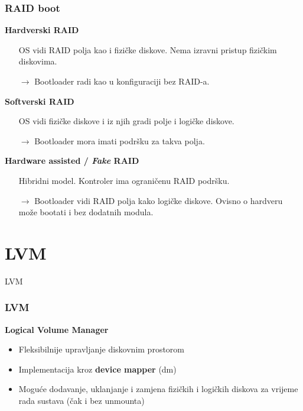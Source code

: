\documentclass[t]{beamer}
\begin{document}
\begin{frame}
	\frametitle{RAID boot}
	\textbf{Hardverski RAID}
	\begin{itemize}
		\item[] OS vidi RAID polja kao i fizičke diskove. Nema izravni pristup fizičkim diskovima.
		\item[$\rightarrow$] Bootloader radi kao u konfiguraciji bez RAID-a.
	\end{itemize}
	\vfill
	\textbf{Softverski RAID}
	\begin{itemize}
		\item[] OS vidi fizičke diskove i iz njih gradi polje i logičke diskove.
		\item[$\rightarrow$] Bootloader mora imati podršku za takva polja.
	\end{itemize}
	\vfill
	\textbf{Hardware assisted / \textit{Fake} RAID}
	\begin{itemize}
		\item[] Hibridni model. Kontroler ima ograničenu RAID podršku.
		\item[$\rightarrow$] Bootloader vidi RAID polja kako logičke diskove. Ovisno o hardveru može bootati i bez dodatnih modula.
	\end{itemize}
\end{frame}

\section{LVM}

\begin{frame}
	\vspace*{\fill}
		\begin{center}
			\Huge{LVM}
		\end{center}
	\vspace*{\fill}
\end{frame}

\begin{frame}
	\frametitle{LVM}
	\textbf{Logical Volume Manager}
	\begin{itemize}
		\item Fleksibilnije upravljanje diskovnim prostorom
		\item Implementacija kroz \textbf{device mapper} (dm)
	\end{itemize}
	\begin{itemize}
		\item Moguće dodavanje, uklanjanje i zamjena fizičkih i logičkih diskova za vrijeme rada sustava (čak i bez unmounta)
	\end{itemize}
\end{frame}
\end{document}

